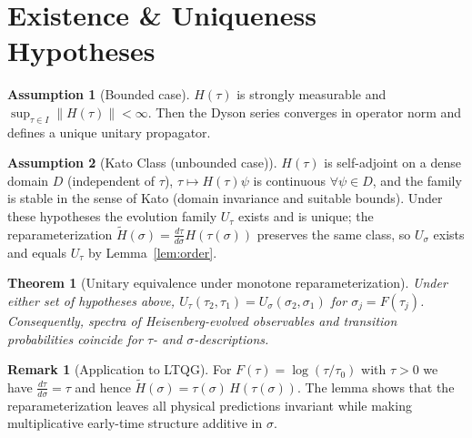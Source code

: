 \documentclass[11pt]{article}
\newtheorem{theorem}{Theorem}
\theoremstyle{definition}
\newtheorem{assumption}{Assumption}
\newtheorem{remark}{Remark}
\begin{document}
\section*{Existence \& Uniqueness Hypotheses}
\begin{assumption}[Bounded case]
$H(\tau)$ is strongly measurable and $\sup_{\tau\in I}\|H(\tau)\|<\infty$. Then the Dyson series converges in operator norm and defines a unique unitary propagator.
\end{assumption}

\begin{assumption}[Kato Class (unbounded case)]
$H(\tau)$ is self-adjoint on a dense domain $D$ (independent of $\tau$), $\tau\mapsto H(\tau)\psi$ is continuous $\forall\psi\in D$, and the family is stable in the sense of Kato (domain invariance and suitable bounds).
Under these hypotheses the evolution family $U_\tau$ exists and is unique; the reparameterization $\tilde H(\sigma)=\frac{d\tau}{d\sigma}H(\tau(\sigma))$ preserves the same class, so $U_\sigma$ exists and equals $U_\tau$ by Lemma~\ref{lem:order}.
\end{assumption}

\begin{theorem}[Unitary equivalence under monotone reparameterization]
Under either set of hypotheses above, $U_\tau(\tau_2,\tau_1)=U_\sigma(\sigma_2,\sigma_1)$ for $\sigma_j=F(\tau_j)$. Consequently, spectra of Heisenberg-evolved observables and transition probabilities coincide for $\tau$- and $\sigma$-descriptions.
\end{theorem}

\begin{remark}[Application to LTQG]
For $F(\tau)=\log(\tau/\tau_0)$ with $\tau>0$ we have $\frac{d\tau}{d\sigma}=\tau$ and hence $\tilde H(\sigma)=\tau(\sigma)\,H(\tau(\sigma))$.
The lemma shows that the reparameterization leaves all physical predictions invariant while making multiplicative early-time structure additive in $\sigma$.
\end{remark}
\end{document}
